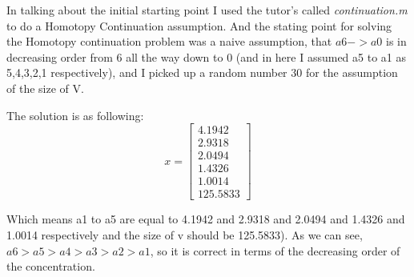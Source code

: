 \documentclass[11pt]{article}
\begin{document}
In talking about the initial starting point I used the tutor's called \textit{continuation.m} to do a Homotopy Continuation assumption. And the stating point for solving the Homotopy continuation problem was a naive assumption, that $a6->a0$ is in decreasing order from 6 all the way down to 0 (and in here I assumed a5 to a1 as 5,4,3,2,1 respectively), and I picked up a random number 30 for the assumption of the size of V.

The solution is as following:
\[
x=
\begin{bmatrix}
4.1942\\
2.9318\\
2.0494\\
1.4326\\
1.0014\\
125.5833
\end{bmatrix}
\]

Which means a1 to a5 are equal to 4.1942 and 2.9318 and 2.0494 and 1.4326 and 1.0014 respectively and the size of v should be 125.5833). As we can see, $a6>a5>a4>a3>a2>a1$, so it is correct in terms of the decreasing order of the concentration.
\end{document}
